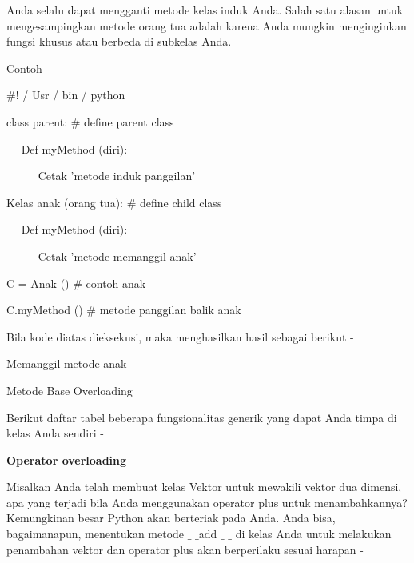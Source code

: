 \begin{12pt}
\begin{12pt}
\begin{12pt}
\begin{12pt}
\begin{12pt}
\begin{12pt}
\begin{12pt}
\begin{12pt}
\begin{12pt}
\begin{12pt}
\begin{12pt}
\begin{12pt}
\begin{12pt}
\begin{12pt}
\begin{12pt}
\begin{12pt}
\begin{12pt}
\begin{12pt}
\begin{12pt}
\vspace{12pt}
Anda selalu dapat mengganti metode kelas induk Anda. Salah satu alasan untuk mengesampingkan metode orang tua adalah karena Anda mungkin menginginkan fungsi khusus atau berbeda di subkelas Anda. \par
Contoh \par
\vspace{12pt}
\noindent 
 $  \#  $! / Usr / bin / python \par
\vspace{12pt}
\noindent 
class parent:  $  \#  $ define parent class \par
\noindent 
~~ Def myMethod (diri): \par
\noindent 
~~~~~ Cetak 'metode induk panggilan' \par
\vspace{12pt}
\noindent 
Kelas anak (orang tua):  $  \#  $ define child class \par
\noindent 
~~ Def myMethod (diri): \par
\noindent 
~~~~~ Cetak 'metode memanggil anak' \par
\vspace{12pt}
\noindent 
C = Anak ()  $  \#  $ contoh anak \par
\noindent 
C.myMethod ()  $  \#  $ metode panggilan balik anak \par
\vspace{12pt}
\noindent 
Bila kode diatas dieksekusi, maka menghasilkan hasil sebagai berikut - \par
\vspace{12pt}
\noindent 
Memanggil metode anak \par
\vspace{12pt}
\noindent 
Metode Base Overloading \par
\vspace{12pt}
\noindent 
Berikut daftar tabel beberapa fungsionalitas generik yang dapat Anda timpa di kelas Anda sendiri - \par
\vspace{14pt}
\noindent 
{\fontsize{14pt}{14pt}\selectfont \textbf{Operator overloading} \\} \par
\vspace{12pt}
Misalkan Anda telah membuat kelas Vektor untuk mewakili vektor dua dimensi, apa yang terjadi bila Anda menggunakan operator plus untuk menambahkannya? Kemungkinan besar Python akan berteriak pada Anda. Anda bisa, bagaimanapun, menentukan metode  $  \_  $ $  \_  $add $  \_  $ $  \_  $ di kelas Anda untuk melakukan penambahan vektor dan operator plus akan berperilaku sesuai harapan - \par

\end{12pt}
\end{12pt}
\end{12pt}
\end{12pt}
\end{12pt}
\end{12pt}
\end{12pt}
\end{12pt}
\end{12pt}
\end{12pt}
\end{12pt}
\end{12pt}
\end{12pt}
\end{12pt}
\end{12pt}
\end{12pt}
\end{12pt}
\end{12pt}
\end{12pt}
